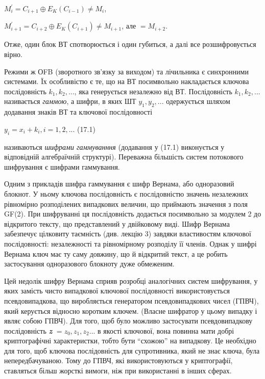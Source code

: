\documentclass[a4paper]{article}
\newcounter{}
\begin{document}
{\centering
 ${M_{{i}}^{{'}}=C_{{i+1}}{\oplus}E_{{K}}(C_{{i-1}})\neq M_{{i}}}$,
\par}

{\centering
 ${M_{{i+1}}^{{'}}=C_{{i+2}}{\oplus}E_{{K}}(C_{{i+1}})\neq M_{{i+1}}}$, але 
${=M_{{i+2}}}$.
\par}

Отже, один блок ВТ спотворюється і один губиться, а далі все розшифровується
вірно.

Режими ж ОFB (зворотного зв’язку за виходом) та  лічильника є синхронними
системами. Їх особливістю є те, що на ВТ посимвольно накладається ключова
послідовність  ${k_{{1}},k_{{2}},\text{.}\text{.}\text{.}}$, яка генерується
незалежно від ВТ. Послідовність  ${k_{{1}},k_{{2}},\text{.}\text{.}\text{.}}$
називається \textit{гаммою}, а шифри, в яких ШТ 
${y_{{1}},y_{{2}},\text{.}\text{.}\text{.}}$ одержується шляхом додавання
знаків ВТ та ключової послідовності 

{\raggedleft
 ${y_{{i}}=x_{{i}}+k_{{i}},i=1,2,\text{.}\text{.}\text{.}}$  (17.1)
\par}

називаються \textit{шифрами гаммуванння}\textbf{ }(додавання у\textbf{ }(17.1)
виконується у відповідній алгебраїчній структурі). Переважна більшість систем
потокового шифрування є шифрами гаммування.

Одним з прикладів шифра гаммування  є шифр Вернама, або одноразовий блокнот. У
ньому ключова послідовність є послідовністю значень незалежних рівномірно
розподілених випадкових величин, що приймають значення з поля GF(2). При
шифруванні ця послідовність додається посимвольно за модулем 2  до відкритого
тексту, що представлений у двійковому виді. Шифр Вернама забезпечує цілковиту
таємність (див. лекцію 3) завдяки властивостям ключової послідовності:
незалежності та рівномірному розподілу її членів. Однак у шифрі Вернама ключ
має ту саму довжину, що й відкритий текст, а це робить застосування
одноразового блокноту дуже обмеженим.

Цей недолік шифру Вернама сприяв розробці аналогічних систем шифрування, у яких
замість чисто випадкової ключової послідовності використовується
псевдовипадкова, що виробляється генератором псевдовипадкових чисел (ГПВЧ),
який керується відносно коротким ключем. (Власне шифратор у цьому випадку і
являє собою ГПВЧ). Для того, щоб було можливо застосувати псевдовипадкову
послідовність \textbf{\textit{z}}
${=z_{{0}},z_{{1}},z_{{2}}\text{.}\text{.}\text{.}}$ в якості ключової, вона
повинна мати добрі криптографічні характеристки, тобто бути “схожою” на
випадкову. Це необхідно для того, щоб ключова послідовність для супротивника,
який не знає ключа, була непередбачуваною. Тому до ГПВЧ, які використовуються у
криптографії, ставляться більш жорсткі вимоги, ніж при використанні в інших
сферах. 
\end{document}
